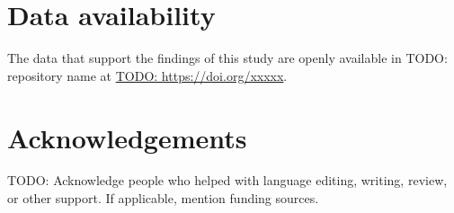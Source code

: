 \documentclass[preprint,12pt]{elsarticle}
\begin{document}
\section*{Data availability}

The data that support the findings of this study are openly available in
TODO: repository name at \url{TODO: https://doi.org/xxxxx}.

\section*{Acknowledgements}

TODO: Acknowledge people who helped with language editing, writing, review, or
other support. If applicable, mention funding sources.


\end{document}

